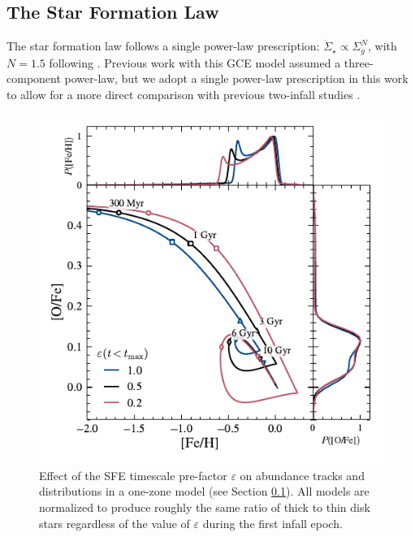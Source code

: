 \documentclass[twocolumn,twocolappendix,linenumbers]{aastex631}
\begin{document}
\subsection{The Star Formation Law}
\label{sec:sf-law}

The star formation law follows a single power-law prescription: $\dot\Sigma_\star\propto\Sigma_g^N$, with $N=1.5$ following \citet{kennicutt_global_1998}. Previous work with this GCE model \citep[e.g.,][]{johnson_stellar_2021,dubay_galactic_2024} assumed a three-component power-law, but we adopt a single power-law prescription in this work to allow for a more direct comparison with previous two-infall studies \citep[e.g.,][]{spitoni_remind_2024}. 

\begin{figure}
    \centering
    \includegraphics{src/tex/figures/sfe_prefactor.pdf}
    \caption{Effect of the SFE timescale pre-factor $\varepsilon$ on abundance tracks and distributions in a one-zone model (see Section \ref{sec:sf-law}). All models are normalized to produce roughly the same ratio of thick to thin disk stars regardless of the value of $\varepsilon$ during the first infall epoch.}
    \label{fig:sfe-prefactor}
\end{figure}
\end{document}
